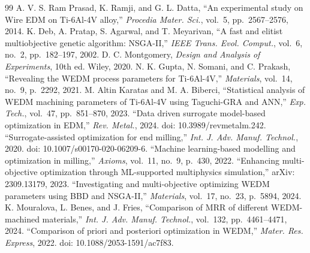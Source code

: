 \documentclass[12pt, a4paper]{report}
\begin{document}
\begin{thebibliography}{99}
 A. V. S. Ram Prasad, K. Ramji, and G. L. Datta, ``An experimental study on Wire EDM on Ti-6Al-4V alloy,'' \textit{Procedia Mater. Sci.}, vol.~5, pp.~2567--2576, 2014.
 K. Deb, A. Pratap, S. Agarwal, and T. Meyarivan, ``A fast and elitist multiobjective genetic algorithm: NSGA-II,'' \textit{IEEE Trans. Evol. Comput.}, vol.~6, no.~2, pp.~182--197, 2002.
 D. C. Montgomery, \textit{Design and Analysis of Experiments}, 10th ed. Wiley, 2020.
 N. K. Gupta, N. Somani, and C. Prakash, ``Revealing the WEDM process parameters for Ti-6Al-4V,'' \textit{Materials}, vol.~14, no.~9, p.~2292, 2021.
 M. Altin Karatas and M. A. Biberci, ``Statistical analysis of WEDM machining parameters of Ti-6Al-4V using Taguchi-GRA and ANN,'' \textit{Exp. Tech.}, vol.~47, pp.~851--870, 2023.
 ``Data driven surrogate model-based optimization in EDM,'' \textit{Rev. Metal.}, 2024. doi: 10.3989/revmetalm.242.
 ``Surrogate-assisted optimization for end milling,'' \textit{Int. J. Adv. Manuf. Technol.}, 2020. doi: 10.1007/s00170-020-06209-6.
 ``Machine learning-based modelling and optimization in milling,'' \textit{Axioms}, vol.~11, no.~9, p.~430, 2022.
 ``Enhancing multi-objective optimization through ML-supported multiphysics simulation,'' arXiv: 2309.13179, 2023.
 ``Investigating and multi-objective optimizing WEDM parameters using BBD and NSGA-II,'' \textit{Materials}, vol.~17, no.~23, p.~5894, 2024.
 K. Mouralova, L. Benes, and J. Fries, ``Comparison of MRR of different WEDM-machined materials,'' \textit{Int. J. Adv. Manuf. Technol.}, vol.~132, pp.~4461--4471, 2024.
 ``Comparison of priori and posteriori optimization in WEDM,'' \textit{Mater. Res. Express}, 2022. doi: 10.1088/2053-1591/ac7f83.
\end{thebibliography}
\clearpage
\onehalfspacing
\end{document}

